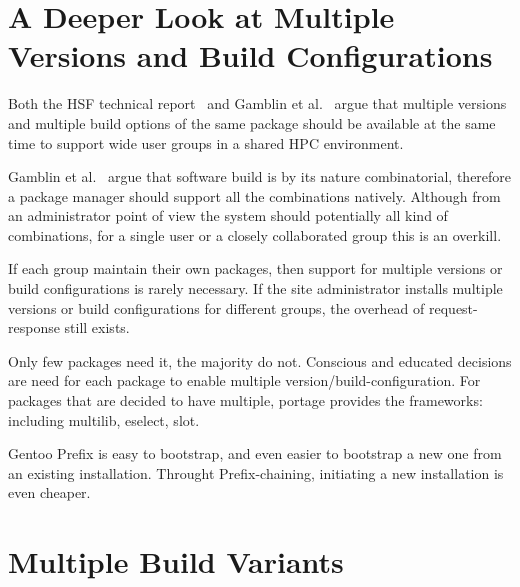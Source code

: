 \documentclass[a4paper,conference]{IEEEtran}
\begin{document}
\section{A Deeper Look at Multiple Versions and Build Configurations}
Both the HSF technical report~\cite{hsf:package} and Gamblin et
al.~\cite{spack} argue that multiple versions and multiple build
options of the same package should be available at the same time to
support wide user groups in a shared HPC environment.

Gamblin et al.~\cite{spack} argue that software build is by its nature
combinatorial, therefore a package manager should support all the
combinations natively.  Although from an administrator point of view
the system should potentially all kind of combinations, for a single
user or a closely collaborated group this is an overkill.

If each group maintain their own packages, then support for multiple
versions or build configurations is rarely necessary.  If the site
administrator installs multiple versions or build configurations for
different groups, the overhead of request-response still exists.

Only few packages need it, the majority do not.  Conscious and
educated decisions are need for each package to enable multiple
version/build-configuration.  For packages that are decided to have
multiple, portage provides the frameworks: including multilib,
eselect, slot.

Gentoo Prefix is easy to bootstrap, and even easier to bootstrap a new
one from an existing installation. Throught Prefix-chaining,
initiating a new installation is even cheaper.

\section{Multiple Build Variants}



\end{document}
